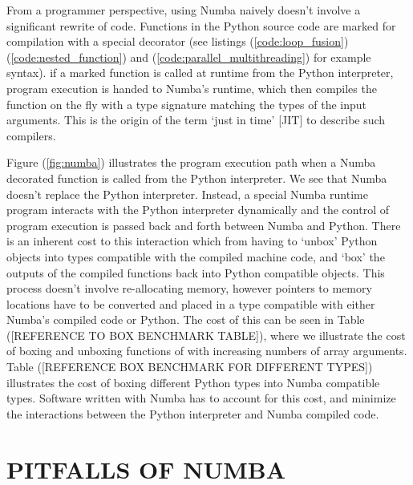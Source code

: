 \documentclass{IEEEcsmag}
\begin{document}
From a programmer perspective, using Numba naively doesn't involve a significant rewrite of code. Functions in the Python source code are marked for compilation with a special decorator (see listings (\ref{code:loop_fusion}) (\ref{code:nested_function}) and (\ref{code:parallel_multithreading}) for example syntax). if a marked function is called at runtime from the Python interpreter, program execution is handed to Numba's runtime, which then compiles the function on the fly with a type signature matching the types of the input arguments. This is the origin of the term `just in time' [JIT] to describe such compilers.

Figure (\ref{fig:numba}) illustrates the program execution path when a Numba decorated function is called from the Python interpreter. We see that Numba doesn't replace the Python interpreter. Instead, a special Numba runtime program interacts with the Python interpreter dynamically and the control of program execution is passed back and forth between Numba and Python. There is an inherent cost to this interaction which from having to `unbox' Python objects into types compatible with the compiled machine code, and `box' the outputs of the compiled functions back into Python compatible objects. This process doesn't involve re-allocating memory, however pointers to memory locations have to be converted and placed in a type compatible with either Numba's compiled code or Python. The cost of this can be seen in Table ([REFERENCE TO BOX BENCHMARK TABLE]), where we illustrate the cost of boxing and unboxing functions of with increasing numbers of array arguments. Table ([REFERENCE BOX BENCHMARK FOR DIFFERENT TYPES]) illustrates the cost of boxing different Python types into Numba compatible types. Software written with Numba has to account for this cost, and minimize the interactions between the Python interpreter and Numba compiled code.



\section{PITFALLS OF NUMBA}
\end{document}
